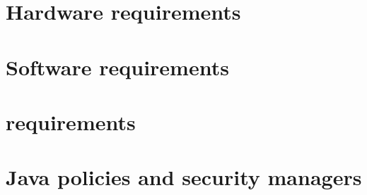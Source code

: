 

\section{Hardware requirements}


\section{Software requirements}


\section{\gdagent requirements}


\section{Java policies and security managers}

